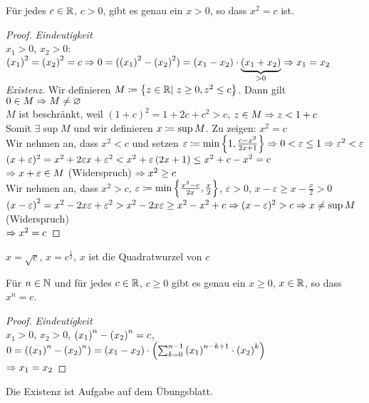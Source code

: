 \begin{satz}
    Für jedes $c\in\mathbb{R}$, $c>0$, gibt es genau ein $x>0$, so dass $x^2 = c$ ist.
    \begin{proof}
        \textit{Eindeutigkeit}\\
        $x_1>0$, $x_2>0$: $\left(x_1\right)^2 = \left(x_2\right)^2 = c \Rightarrow{} 0 = (\left(x_1\right)^2-\left(x_2\right)^2) = (x_1-x_2) \cdot \underbrace{(x_1+x_2)}_{>0} \Rightarrow{} x_1 = x_2$\\
        \textit{Existenz.} Wir definieren $M\coloneqq\left\{z\in\mathbb{R}|~z\geq 0, z^2 \leq c\right\}$. Dann gilt $0\in M \Rightarrow{} M\neq \varnothing$\\[10pt]
        $M$ ist beschränkt, weil $(1+c)^2=1+2c+c^2 > c$, \quad$z\in M \Rightarrow{} z < 1 + c$\\
        Somit $\exists \sup M$ und wir definieren $x\coloneqq \sup M$. Zu zeigen: $x^2 = c$\\[10pt]
        Wir nehmen an, dass $x^2<c$ und setzen $\varepsilon \coloneqq \min\left\{1, \frac{c-x^2}{2x+1}\right\} \Rightarrow{} 0 < \varepsilon \leq 1 \Rightarrow{} \varepsilon^2 < \varepsilon$\\
        $(x+\varepsilon)^2 = x^2 + 2\varepsilon x + \varepsilon^2 < x^2+\varepsilon\left(2x+1\right)\leq x^2+c-x^2=c$\\
        $\Rightarrow{} x+\varepsilon\in M$ (Widerspruch) $\Rightarrow{} x^2 \geq c$\\[10pt]
        Wir nehmen an, dass $x^2 > c$, $\varepsilon \coloneqq\min\left\{\frac{x^2-c}{2x}, \frac{x}{2}\right\}$, $\varepsilon > 0$, $x-\varepsilon \geq x-\frac{x}{2}>0$\\
        $\left(x-\varepsilon\right)^2 = x^2 - 2 x\varepsilon + \varepsilon^2 > x^2-2x\varepsilon \geq x^2-x^2+c\Rightarrow{} (x-\varepsilon)^2 > c \Rightarrow{} x\neq \sup M$ (Widerspruch)\\[10pt]
        $\Rightarrow{} x^2 = c$
    \end{proof}
\end{satz}

\begin{bemerkung}
    $x=\sqrt {c}$, $x=c^{\frac{1}{2}}$, $x$ ist die Quadratwurzel von $c$
\end{bemerkung}

\begin{satz}
    Für $n\in\mathbb{N}$ und für jedes $c\in\mathbb{R}$, $c\geq 0$ gibt es genau ein $x \geq 0$, $x\in\mathbb{R}$, so dass $x^n = c$.
    \begin{proof}
        \textit{Eindeutigkeit}\\
        $x_1>0$, $x_2>0$, $\left(x_1\right)^n-\left(x_2\right)^n = c$, $0=\left(\left(x_1\right)^n-\left(x_2\right)^n\right) = \left(x_1 - x_2\right)\cdot\left(\sum_{k=0}^{n-1} \left(x_1\right)^{n-k+1}\cdot \left(x_2\right)^k\right)$\\
        $\Rightarrow{} x_1 = x_2$
    \end{proof}
    \noindent Die Existenz ist Aufgabe auf dem Übungsblatt.
\end{satz}

